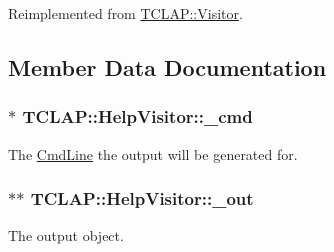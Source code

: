 Reimplemented from \hyperlink{class_t_c_l_a_p_1_1_visitor_a08625664637579a24ba2f0ab3e713670}{T\+C\+L\+A\+P\+::\+Visitor}.



\subsection{Member Data Documentation}
\hypertarget{class_t_c_l_a_p_1_1_help_visitor_afc7e0402f4e09ab6eff91680ea87ea57}{
\subsubsection[{\+\_\+cmd}]{$\ast$ T\+C\+L\+A\+P\+::\+Help\+Visitor\+::\+\_\+cmd\hspace{0.3cm}{\ttfamily [protected]}}}\label{class_t_c_l_a_p_1_1_help_visitor_afc7e0402f4e09ab6eff91680ea87ea57}
The \hyperlink{class_t_c_l_a_p_1_1_cmd_line}{Cmd\+Line} the output will be generated for. \hypertarget{class_t_c_l_a_p_1_1_help_visitor_ae12c2d2208b64377a6360fb335454877}{
\subsubsection[{\+\_\+out}]{$\ast$$\ast$ T\+C\+L\+A\+P\+::\+Help\+Visitor\+::\+\_\+out\hspace{0.3cm}{\ttfamily [protected]}}}\label{class_t_c_l_a_p_1_1_help_visitor_ae12c2d2208b64377a6360fb335454877}
The output object. 